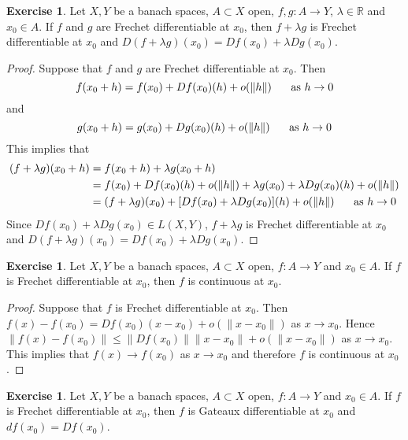 \documentclass[12pt]{amsart}
\theoremstyle{definition}
\newtheorem{ex}[definition]{Exercise}
\newcommand{\lam}{\lambda}
\newcommand{\R}{\mathbb{R}}
\DeclareMathOperator*{\0}{\mbf{0}}
\DeclareMathOperator*{\1}{\mbf{1}}
\newcommand{\lex}[1]{\label{ex:#1}}
\begin{document}
	\begin{ex} \lex{62004}
	Let $X, Y$ be a banach spaces, $A \subset X$ open, $f,g:A \rightarrow Y$, $\lam \in \R$ and $x_0 \in A$. If $f$ and $g$ are Frechet differentiable at $x_0$, then $f+ \lam g$ is Frechet differentiable at $x_0$ and $D(f+\lam g)(x_0) = Df(x_0) + \lam Dg(x_0)$.
	\end{ex}
	
	\begin{proof}
	Suppose that $f$ and $g$ are Frechet differentiable at $x_0$. Then $$f(x_0 + h) = f(x_0) + Df(x_0)(h) + o(\|h\| ) \hspace{.5cm} \text{ as } h \rightarrow 0$$  and $$g(x_0 + h) = g(x_0) + Dg(x_0)(h) + o(\|h\| ) \hspace{.5cm} \text{ as } h \rightarrow 0$$  
	This implies that 
	\begin{align*}
	(f+\lam g)(x_0 + h) 
	&= f(x_0 + h) +\lam g(x_0 + h) \\
	&= f(x_0) + Df(x_0)(h) + o(\|h\| ) + \lam g(x_0) + \lam Dg(x_0)(h) + o(\|h\| ) \\
	&= (f+\lam g)(x_0) + [Df(x_0)+ \lam Dg(x_0)](h) + o(\|h\|) \hspace{.5cm} \text{ as } h \rightarrow 0
	\end{align*}
	Since $Df(x_0)+\lam Dg(x_0) \in L(X,Y)$, $f+\lam g$ is Frechet differentiable at $x_0$ and $D(f+\lam g)(x_0) = Df(x_0) + \lam Dg(x_0)$. 
	\end{proof}
	
	\begin{ex}\lex{62004.5}
	Let $X, Y$ be a banach spaces, $A \subset X$ open, $f:A \rightarrow Y$ and $x_0 \in A$. If $f$ is Frechet differentiable at $x_0$, then $f$ is continuous at $x_0$. 
	\end{ex}
	
	\begin{proof}
	Suppose that $f$ is Frechet differentiable at $x_0$. Then $f(x) - f(x_0) = Df(x_0)(x - x_0) + o(\|x - x_0\|)$ as $x \rightarrow x_0$. Hence $\|f(x) - f(x_0)\| \leq \| Df(x_0)\| \|x - x_0 \| + o(\|x - x_0\|)$ as $x \rightarrow x_0$. This implies that $f(x) \rightarrow f(x_0)$ as $x \rightarrow x_0$ and therefore $f$ is continuous at $x_0$.
	\end{proof}
	
	\begin{ex} \lex{62005}
	Let $X, Y$ be a banach spaces, $A \subset X$ open, $f:A \rightarrow Y$ and $x_0 \in A$. If $f$ is Frechet differentiable at $x_0$, then $f$ is Gateaux differentiable at $x_0$ and $df(x_0) = Df(x_0)$.
	\end{ex}
	
\end{document}
